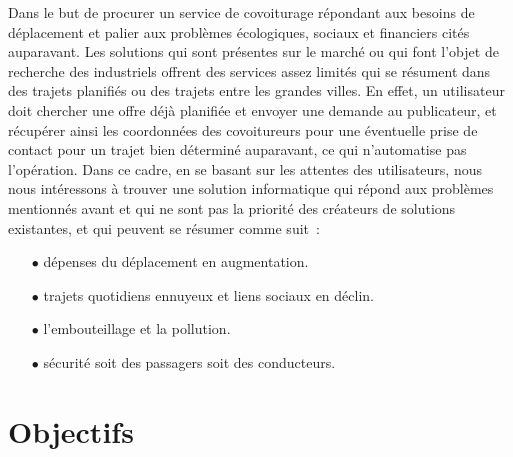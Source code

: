 Dans le but de procurer un service de covoiturage répondant aux besoins de déplacement et palier aux problèmes écologiques, sociaux et financiers cités auparavant.\newline
Les solutions qui sont présentes sur le marché ou qui font l'objet de recherche des industriels offrent des services assez limités qui se résument dans des trajets planifiés ou des trajets entre les grandes villes.\newline
En effet, un utilisateur doit chercher une offre déjà planifiée et envoyer une demande au publicateur, et récupérer ainsi les coordonnées des covoitureurs pour une éventuelle prise de contact pour un trajet bien déterminé auparavant, ce qui n'automatise pas l’opération.\newline
Dans ce cadre, en se basant sur les attentes des utilisateurs, nous nous intéressons à trouver une solution informatique qui répond aux problèmes mentionnés avant et qui ne sont pas la priorité des créateurs de solutions existantes, et qui peuvent se résumer comme suit :
\begin{itemize}
 
\item[$\bullet$] dépenses du déplacement en augmentation.
\item[$\bullet$] trajets quotidiens ennuyeux et liens sociaux en déclin.
\item[$\bullet$] l'embouteillage et la pollution.
\item[$\bullet$] sécurité soit des passagers soit des conducteurs.
 
\end{itemize}

\section{Objectifs}

